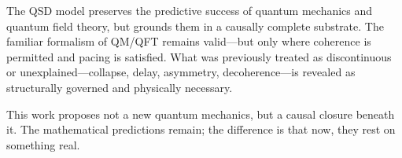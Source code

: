 \documentclass[preprints,article,submit,pdftex,moreauthors]{Definitions/mdpi}
\begin{document}
The QSD model preserves the predictive success of quantum mechanics and quantum field theory, but grounds them in a causally complete substrate. The familiar formalism of QM/QFT remains valid—but only where coherence is permitted and pacing is satisfied. What was previously treated as discontinuous or unexplained—collapse, delay, asymmetry, decoherence—is revealed as structurally governed and physically necessary.

This work proposes not a new quantum mechanics, but a causal closure beneath it. The mathematical predictions remain; the difference is that now, they rest on something real.



\vspace{6pt} 




\end{document}
